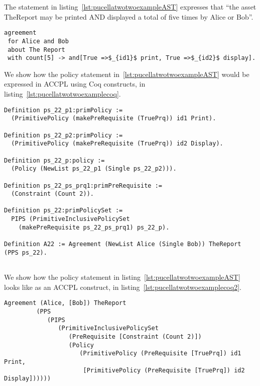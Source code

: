 The statement in listing~\ref{lst:pucellatwotwoexampleAST}  expresses that ``the asset TheReport may be printed AND displayed a total of five times by Alice or Bob''.


\lstset{language=Pucella2006}
\begin{minipage}[c]{0.95\textwidth}
\begin{lstlisting}[frame=single, caption={Agreement of Example 2.2}, label={lst:pucellatwotwoexampleAST}, mathescape]
agreement
 for Alice and Bob 
 about The Report 
 with count[5] -> and[True =>$_{id1}$ print, True =>$_{id2}$ display].
\end{lstlisting}
\end{minipage} 

We show how the policy statement in~\ref{lst:pucellatwotwoexampleAST} would be expressed in \ac{ACCPL} using Coq constructs, in listing~\ref{lst:pucellatwotwoexamplecoq}.

\begin{minipage}[c]{0.95\textwidth}
\begin{lstlisting}
Definition ps_22_p1:primPolicy := 
  (PrimitivePolicy (makePreRequisite (TruePrq)) id1 Print).

Definition ps_22_p2:primPolicy := 
  (PrimitivePolicy (makePreRequisite (TruePrq)) id2 Display).

Definition ps_22_p:policy := 
  (Policy (NewList ps_22_p1 (Single ps_22_p2))).

Definition ps_22_ps_prq1:primPreRequisite := 
  (Constraint (Count 2)).

Definition ps_22:primPolicySet :=
  PIPS (PrimitiveInclusivePolicySet
    (makePreRequisite ps_22_ps_prq1) ps_22_p).

Definition A22 := Agreement (NewList Alice (Single Bob)) TheReport (PPS ps_22).
		
\end{lstlisting}
\end{minipage} 

We show how the policy statement in listing~\ref{lst:pucellatwotwoexampleAST} looks like as an \ac{ACCPL} construct, in listing~\ref{lst:pucellatwotwoexamplecoq2}.

\begin{minipage}[c]{0.95\textwidth}
\begin{lstlisting}
Agreement (Alice, [Bob]) TheReport
         (PPS
            (PIPS
               (PrimitiveInclusivePolicySet
                  (PreRequisite [Constraint (Count 2)])
                  (Policy
                     (PrimitivePolicy (PreRequisite [TruePrq]) id1 Print,
                      [PrimitivePolicy (PreRequisite [TruePrq]) id2 Display])))))

\end{lstlisting}
\end{minipage} 


